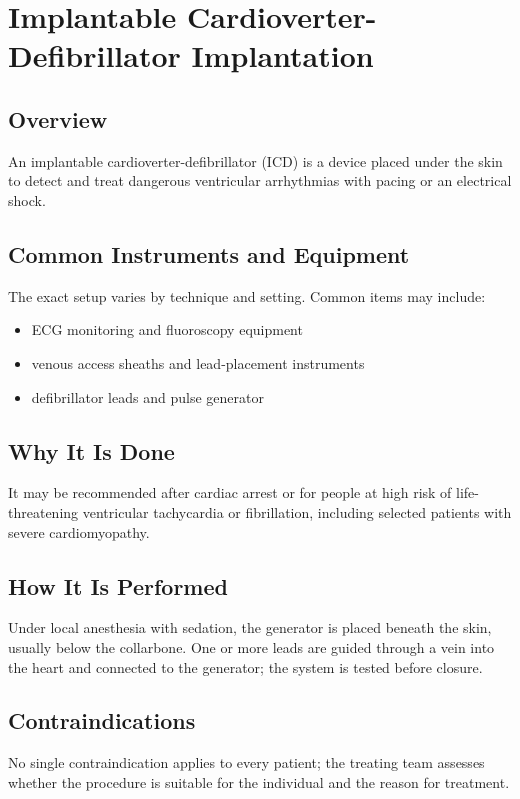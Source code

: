 \chapter{Implantable Cardioverter-Defibrillator Implantation}

\section*{Overview}
An implantable cardioverter-defibrillator (ICD) is a device placed under the skin to detect and treat dangerous ventricular arrhythmias with pacing or an electrical shock.

\section*{Common Instruments and Equipment}
The exact setup varies by technique and setting. Common items may include:
\begin{itemize}[nosep,leftmargin=*]
  \item ECG monitoring and fluoroscopy equipment
  \item venous access sheaths and lead-placement instruments
  \item defibrillator leads and pulse generator
\end{itemize}

\section*{Why It Is Done}
It may be recommended after cardiac arrest or for people at high risk of life-threatening ventricular tachycardia or fibrillation, including selected patients with severe cardiomyopathy.

\section*{How It Is Performed}
Under local anesthesia with sedation, the generator is placed beneath the skin, usually below the collarbone. One or more leads are guided through a vein into the heart and connected to the generator; the system is tested before closure.

\section*{Contraindications}
No single contraindication applies to every patient; the treating team assesses whether the procedure is suitable for the individual and the reason for treatment.

